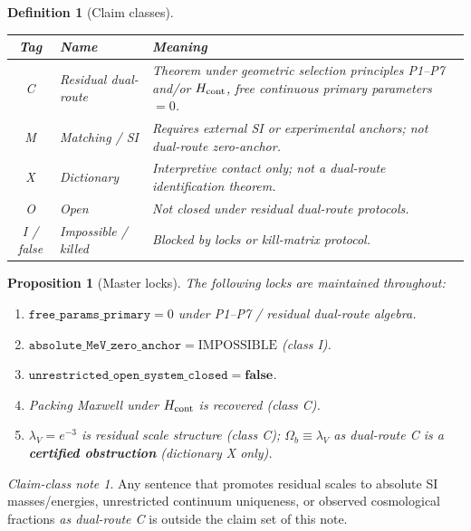 \documentclass[11pt,a4paper]{article}
\newtheorem{proposition}{Proposition}
\newtheorem{definition}{Definition}
\theoremstyle{remark}
\newtheorem{claimclass}{Claim-class note}
\begin{document}
\begin{definition}[Claim classes]
\label{def:classes}
\begin{center}
\begin{tabular}{@{}clp{8.2cm}@{}}
\toprule
\textbf{Tag} & \textbf{Name} & \textbf{Meaning} \\
\midrule
C & Residual dual-route & Theorem under geometric selection principles P1--P7 and/or $H_{\rm cont}$, free continuous primary parameters $=0$. \\
M & Matching / SI & Requires external SI or experimental anchors; not dual-route zero-anchor. \\
X & Dictionary & Interpretive contact only; not a dual-route identification theorem. \\
O & Open & Not closed under residual dual-route protocols. \\
I / false & Impossible / killed & Blocked by locks or kill-matrix protocol. \\
\bottomrule
\end{tabular}
\end{center}
\end{definition}

\begin{proposition}[Master locks]
\label{prop:locks}
The following locks are maintained throughout:
\begin{enumerate}[label=(\roman*)]
\item $\texttt{free\_params\_primary}=0$ under P1--P7 / residual dual-route algebra.
\item $\texttt{absolute\_MeV\_zero\_anchor}=\mathrm{IMPOSSIBLE}$ (class I).
\item $\texttt{unrestricted\_open\_system\_closed}=\mathbf{false}$.
\item Packing Maxwell under $H_{\rm cont}$ is recovered (class C).
\item $\lambda_V=e^{-3}$ is residual scale structure (class C); $\Omega_b\equiv\lambda_V$ as dual-route C is a \textbf{certified obstruction} (dictionary X only).
\end{enumerate}
\end{proposition}

\begin{claimclass}
Any sentence that promotes residual scales to absolute SI masses/energies, unrestricted continuum uniqueness, or observed cosmological fractions \emph{as dual-route C} is outside the claim set of this note.
\end{claimclass}
\end{document}
